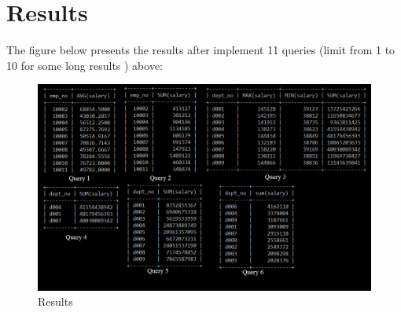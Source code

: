 \documentclass{article}
\begin{document}
\section*{Results}

The figure below presents the results after implement 11 queries (limit from 1 to 10 for some long results
) above:\\
\begin{figure}
\includegraphics[scale = 0.65]{result.PNG}
\caption{Results}
\end{figure}
\end{document}
